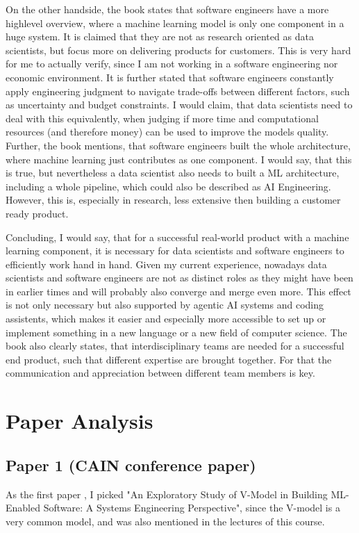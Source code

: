 \documentclass[11pt]{article}
\begin{document}
On the other handside, the book states that software engineers have a more highlevel overview, where a machine learning model is only one component in a huge system. It is claimed that they are not as research oriented as data scientists, but focus more on delivering products for customers. This is very hard for me to actually verify, since I am not working in a software engineering nor economic environment. It is further stated that software engineers constantly apply engineering judgment to navigate trade-offs between different factors, such as uncertainty and budget constraints. I would claim, that data scientists need to deal with this equivalently, when judging if more time and computational resources (and therefore money) can be used to improve the models quality. Further, the book mentions, that software engineers built the whole architecture, where machine learning just contributes as one component. I would say, that this is true, but nevertheless a data scientist also needs to built a ML architecture, including a whole pipeline, which could also be described as AI Engineering. However, this is, especially in research, less extensive then building a customer ready product. 

Concluding, I would say, that for a successful real-world product with a machine learning component, it is necessary for data scientists and software engineers to efficiently work hand in hand. Given my current experience, nowadays data scientists and software engineers are not as distinct roles as they might have been in earlier times and will probably also converge and merge even more. This effect is not only necessary but also supported by agentic AI systems and coding assistents, which makes it easier and especially more accessible to set up or implement something in a new language or a new field of computer science. The book also clearly states, that interdisciplinary teams are needed for a successful end product, such that different expertise are brought together. For that the communication and appreciation between different team members is key.

\section{Paper Analysis}

\subsection{Paper 1 (CAIN conference paper)} \label{ch:CAIN_paper}
As the first paper \citep{Wu2024Exploratory}, I picked "An Exploratory Study of V-Model in Building ML-Enabled Software: A Systems Engineering Perspective", since the V-model is a very common model, and was also mentioned in the lectures of this course.
\end{document}
